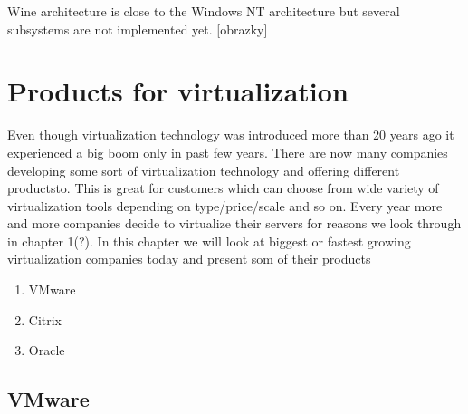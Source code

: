 \begin{itemize}
Wine architecture is close to the Windows NT architecture but several subsystems are not implemented yet.
[obrazky]


\chapter{Products for virtualization}

Even though virtualization technology was introduced more than 20 years ago it experienced a big boom only in past few years. There are now many companies developing some sort of virtualization technology and offering different productsto. This is great for customers which can choose from wide variety of virtualization tools depending on type/price/scale and so on. Every year more and more companies decide to virtualize their servers for reasons we look through in chapter 1(?). In this chapter we will look at biggest or fastest growing virtualization companies today and present som of their products

\begin{enumerate}
\item VMware
\item Citrix
\item Oracle
\end{enumerate}

\section{VMware}


\end{itemize}
